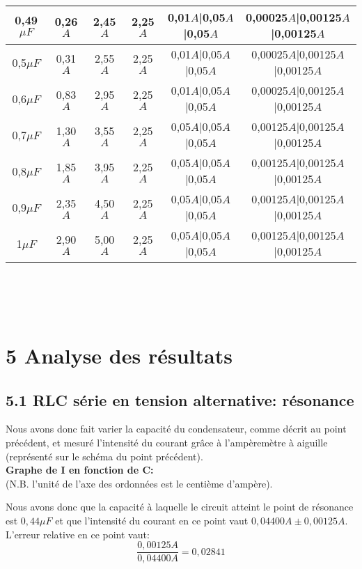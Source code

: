 \documentclass{report}
\begin{document}
\begin{tabular}{|c|c|c|c|c|c|}
\hline
0,49$\mu F$ & 0,26$A$ & 2,45$A$ & 2,25$A$ & 0,01$A$|0,05$A$|0,05$A$ & 0,00025$A$|0,00125$A$|0,00125$A$ \\
\hline
0,5$\mu F$ & 0,31$A$ & 2,55$A$ & 2,25$A$ & 0,01$A$|0,05$A$|0,05$A$ & 0,00025$A$|0,00125$A$|0,00125$A$ \\
\hline
0,6$\mu F$ & 0,83$A$ & 2,95$A$ & 2,25$A$ & 0,01$A$|0,05$A$|0,05$A$ & 0,00025$A$|0,00125$A$|0,00125$A$ \\
\hline
0,7$\mu F$ & 1,30$A$ & 3,55$A$ & 2,25$A$ & 0,05$A$|0,05$A$|0,05$A$ & 0,00125$A$|0,00125$A$|0,00125$A$ \\
\hline
0,8$\mu F$ & 1,85$A$ & 3,95$A$ & 2,25$A$ & 0,05$A$|0,05$A$|0,05$A$ & 0,00125$A$|0,00125$A$|0,00125$A$ \\
\hline
0,9$\mu F$ & 2,35$A$ & 4,50$A$ & 2,25$A$ & 0,05$A$|0,05$A$|0,05$A$ & 0,00125$A$|0,00125$A$|0,00125$A$ \\
\hline
1$\mu F$ & 2,90$A$ & 5,00$A$ & 2,25$A$ & 0,05$A$|0,05$A$|0,05$A$ & 0,00125$A$|0,00125$A$|0,00125$A$ \\
\hline


\end{tabular}\\ ~~\\ ~~\\


\pagebreak
\section*{5 Analyse des r\'esultats}

\subsection*{5.1 RLC s\'erie en tension alternative: r\'esonance}

Nous avons donc fait varier la capacit\'e du condensateur, comme d\'ecrit au point pr\'ec\'edent, et mesur\'e l'intensit\'e du courant gr\^ace \`a l'amp\`erem\`etre \`a aiguille (repr\'esent\'e sur le sch\'ema du point pr\'ec\'edent). \\

\textbf{Graphe de I en fonction de C: } \\ 
(N.B. l'unit\'e de l'axe des ordonn\'ees est le centi\`eme d'amp\`ere).
\begin{figure}[h]
\centering
\end{figure}

Nous avons donc que la capacit\'e \`a laquelle le circuit atteint le point de r\'esonance est $0,44\mu F$ et que l'intensit\'e du courant en ce point vaut $0,04400A \pm 0,00125A$. \\
L'erreur relative en ce point vaut: $$\frac{0,00125A}{0,04400A} = 0,02841$$
\end{document}

